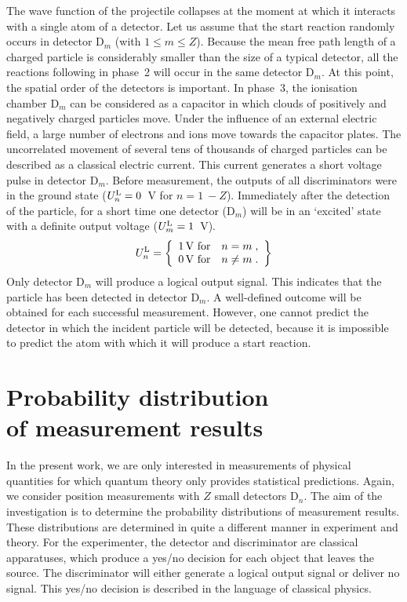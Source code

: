 \documentclass[12pt]{article}
\begin{document}
The wave function of the projectile collapses at the moment at which it interacts with a single atom of a detector.  Let us assume that the start reaction randomly occurs in detector D$_m$ (with $1 \le m \le Z$).  
Because the mean free path length of a charged particle is considerably smaller than the size of a typical detector, all the reactions following in phase~2 will occur in the same detector D$_m$. At this point, the spatial order of the detectors is important.  
In phase~3, the ionisation chamber D$_m$ can be considered as a capacitor in which clouds of positively and negatively charged particles move.  
Under the influence of an external electric field, a large number of electrons and ions move towards the capacitor plates.  
The uncorrelated movement of several tens of thousands of charged particles can be described as a classical electric current.  
This current generates a short voltage pulse in detector D$_m$.  
Before measurement, the outputs of all discriminators were in the ground state ($U_n^{\rm L}=0$~V for $n=1~- Z$). Immediately after the detection of the particle, for a short time one detector (D$_m$) will be in an `excited' state with a definite output voltage ($U_m^{\rm L}=1$~V).    
%
\[ U_n^{\rm L} = \left\{ \begin{array}{rl} 1\,  \mbox{V for} & n=m \;, \\
0\,  \mbox{V for} &  n \ne m  \;. \end{array} \right\}    \]
%
Only detector D$_m$ will produce a logical output signal.  
This indicates that the particle has been detected in detector D$_m$.  
A well-defined outcome will be obtained for each successful measurement.  
However, one cannot predict the detector in which the incident particle will be detected, because it is impossible to predict the atom with which it will produce a start reaction.  


\section{Probability distribution \\ of measurement results}\label{ch_prob-dis}

In the present work, we are only interested in measurements of physical quantities for which quantum theory only provides statistical predictions.  
Again, we consider position measurements with $Z$ small detectors D$_n$.  
The aim of the investigation is to determine the probability distributions of measurement results.  These distributions are determined in quite a different manner in experiment and theory.  
For the experimenter, the detector and discriminator are classical apparatuses, which produce a yes/no decision for each object that leaves the source. The discriminator will either generate a logical output signal or deliver no signal.  This yes/no decision is described in the language of classical physics.  
\end{document}
